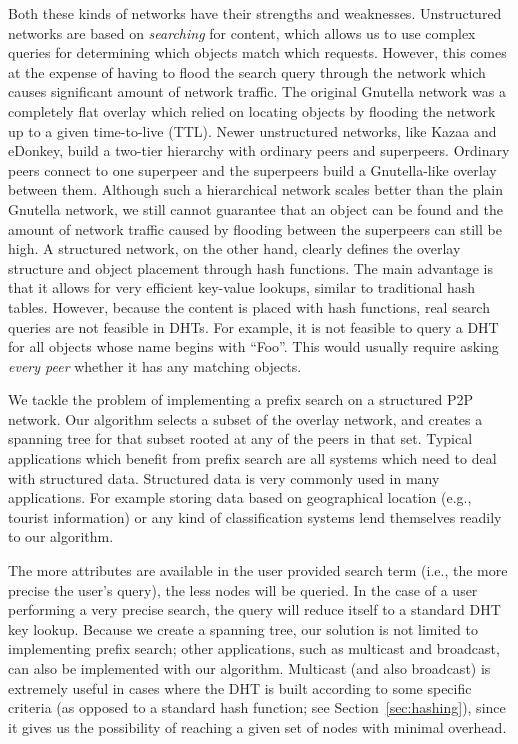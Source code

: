 \documentclass[fleqn,12pt,twoside]{article}
\begin{document}
Both these kinds of networks have their strengths and weaknesses.
Unstructured networks are based on \emph{searching} for content, which
allows us to use complex queries for determining which objects match
which requests. However, this comes at the expense of having to flood
the search query through the network which causes significant amount
of network traffic. The original Gnutella network was a completely
flat overlay which relied on locating objects by flooding the network
up to a given time-to-live (TTL). Newer unstructured networks, like Kazaa and
eDonkey, build a two-tier hierarchy with ordinary peers and
superpeers. Ordinary peers connect to one superpeer and the superpeers
build a Gnutella-like overlay between them. Although such a
hierarchical network scales better than the plain Gnutella network, we
still cannot guarantee that an object can be found and the amount of
network traffic caused by flooding between the superpeers can still be
high. A structured network, on the other hand, clearly defines the overlay
structure and object placement through hash functions. The main
advantage is that it allows for very efficient key-value lookups,
similar to traditional hash tables. However, because the content is
placed with hash functions, real search queries are not feasible in
DHTs. For example, it is not feasible to query a DHT for all objects
whose name begins with ``Foo''. This would usually require asking
\emph{every peer} whether it has any matching objects.

We tackle the problem of implementing a prefix search on a structured
P2P network. Our algorithm selects a subset of the overlay network,
and creates a spanning tree for that subset rooted at any of the peers
in that set. Typical applications which benefit from prefix search are
all systems which need to deal with structured data. Structured data
is very commonly used in many applications. For example storing data
based on geographical location (e.g., tourist information) or any kind
of classification systems lend themselves readily to our algorithm.

The more attributes are available in the user provided search term
(i.e., the more precise the user's query), the less nodes will be
queried. In the case of a user performing a very precise search, the
query will reduce itself to a standard DHT key lookup.  Because we
create a spanning tree, our solution is not limited to implementing
prefix search; other applications, such as multicast and broadcast,
can also be implemented with our algorithm. Multicast (and also
broadcast) is extremely useful in cases where the DHT is built
according to some specific criteria (as opposed to a standard hash
function; see Section~\ref{sec:hashing}), since it gives us the
possibility of reaching a given set of nodes with minimal overhead.
\end{document}
